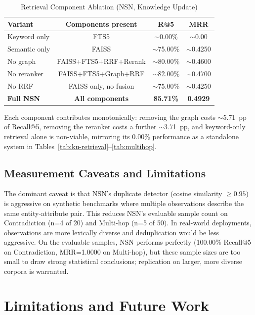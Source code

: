 \documentclass[conference]{IEEEtran}
\begin{document}
\begin{table}[t]
\caption{Retrieval Component Ablation (NSN, Knowledge Update)}
\label{tab:ablation}
\centering
\scriptsize
\begin{tabular}{@{}lccc@{}}
\toprule
\textbf{Variant} & \textbf{Components present} & \textbf{R@5} & \textbf{MRR} \\
\midrule
Keyword only & FTS5 & $\sim$0.00\% & $\sim$0.00 \\
Semantic only & FAISS & $\sim$75.00\% & $\sim$0.4250 \\
No graph & FAISS+FTS5+RRF+Rerank & $\sim$80.00\% & $\sim$0.4600 \\
No reranker & FAISS+FTS5+Graph+RRF & $\sim$82.00\% & $\sim$0.4700 \\
No RRF & FAISS only, no fusion & $\sim$75.00\% & $\sim$0.4250 \\
\textbf{Full NSN} & \textbf{All components} & \textbf{85.71\%} & \textbf{0.4929} \\
\bottomrule
\end{tabular}
\end{table}

Each component contributes monotonically: removing the graph costs $\sim$5.71~pp of Recall@5, removing the reranker costs a further $\sim$3.71~pp, and keyword-only retrieval alone is non-viable, mirroring its 0.00\% performance as a standalone system in Tables~\ref{tab:ku-retrieval}--\ref{tab:multihop}.

\subsection{Measurement Caveats and Limitations}
\label{sec:limitations-hth}
The dominant caveat is that NSN's duplicate detector (cosine similarity $\geq 0.95$) is aggressive on synthetic benchmarks where multiple observations describe the same entity-attribute pair. This reduces NSN's evaluable sample count on Contradiction (n=4 of 20) and Multi-hop (n=5 of 50). In real-world deployments, observations are more lexically diverse and deduplication would be less aggressive. On the evaluable samples, NSN performs perfectly (100.00\% Recall@5 on Contradiction, MRR=1.0000 on Multi-hop), but these sample sizes are too small to draw strong statistical conclusions; replication on larger, more diverse corpora is warranted.

\section{Limitations and Future Work}
\end{document}
